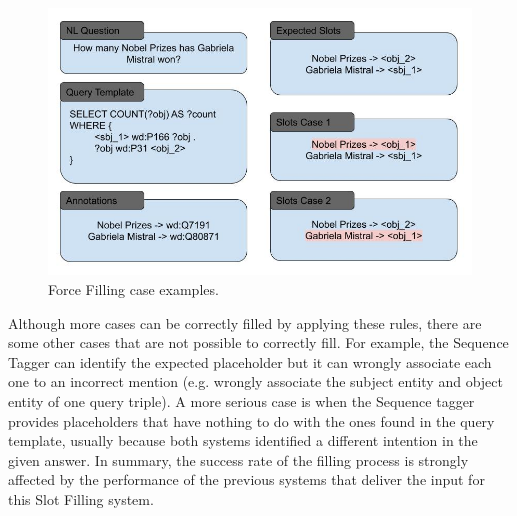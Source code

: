 \begin{figure}[!h]
    \centering
    \includegraphics[scale=.45]{imagenes/3_system_overview/slotFillingExample.png}
    \caption{Force Filling case examples.}
    \label{fig:forceFillingExample}
\end{figure}

Although more cases can be correctly filled by applying these rules, there are some other 
cases that are not possible to correctly fill. For example, the Sequence Tagger can identify 
the expected placeholder but it can wrongly associate each one to an incorrect mention (e.g. 
wrongly associate the subject entity and object entity of one query triple). A more serious 
case is when the Sequence tagger provides placeholders that have nothing to do with the ones 
found in the query template, usually because both systems identified a different intention in 
the given answer. In summary, the success rate of the filling process is strongly affected by 
the performance of the previous systems that deliver the input for this Slot Filling system.
